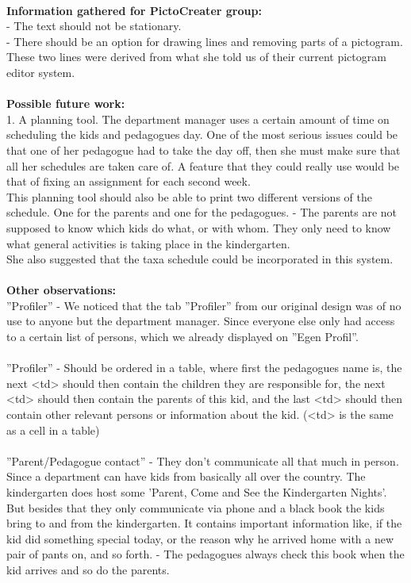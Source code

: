\\
\textbf{Information gathered for PictoCreater group:}\\
- The text should not be stationary.\\
- There should be an option for drawing lines and removing parts of a pictogram.\\
These two lines were derived from what she told us of their current pictogram editor system.\\
\\
\textbf{Possible future work:}\\
1. A planning tool. The department manager uses a certain amount of time on scheduling the kids and pedagogues day. One of the most serious issues could be that one of her pedagogue had to take the day off, then she must make sure that all her schedules are taken care of. A feature that they could really use would be that of fixing an assignment for each second week.\\
This planning tool should also be able to print two different versions of the schedule. One for the parents and one for the pedagogues. - The parents are not supposed to know which kids do what, or with whom. They only need to know what general activities is taking place in the kindergarten.\\
She also suggested that the taxa schedule could be incorporated in this system.\\
\\
\textbf{Other observations:}\\
''Profiler'' - We noticed that the tab ''Profiler'' from our original design was of no use to anyone but the department manager. Since everyone else only had access to a certain list of persons, which we already displayed on ''Egen Profil''.\\
\\
''Profiler'' - Should be ordered in a table, where first the pedagogues name is, the next <td> should then contain the children they are responsible for, the next <td> should then contain the parents of this kid, and the last <td> should then contain other relevant persons or information about the kid. (<td> is the same as a cell in a table)\\
\\
''Parent/Pedagogue contact'' - They don't communicate all that much in person. Since a department can have kids from basically all over the country. The kindergarten does host some 'Parent, Come and See the Kindergarten Nights'. But besides that they only communicate via phone and a black book the kids bring to and from the kindergarten. It contains important information like, if the kid did something special today, or the reason why he arrived home with a new pair of pants on, and so forth. - The pedagogues always check this book when the kid arrives and so do the parents.\\

